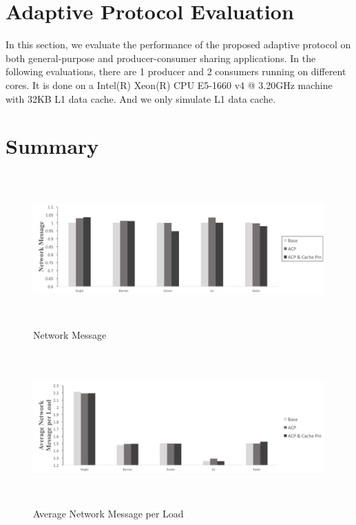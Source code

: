 \documentclass[conference]{IEEEtran}
\begin{document}
\newpage

\section{Adaptive Protocol Evaluation}
In this section, we evaluate the performance of the proposed adaptive protocol on both general-purpose and producer-consumer sharing applications. In the following evaluations, there are 1 producer and 2 consumers running on different cores. It is done on a Intel(R) Xeon(R) CPU E5-1660 v4 @ 3.20GHz machine with 32KB L1 data cache. And we only simulate L1 data cache.

\section{Summary}

\newpage

\begin{figure}[!h]
\centering
\captionsetup{justification=centering}
\includegraphics[width=7.35in,height=2.3in]{network_msg.png}
\caption{Network Message}
\label{network_msg}
\end{figure}
\FloatBarrier

\begin{figure}[!h]
\centering
\captionsetup{justification=centering}
\includegraphics[width=7.35in,height=2.3in]{avg_network_msg_per_load.png}
\caption{Average Network Message per Load}
\label{avg_network_msg_per_load}
\end{figure}
\end{document}
